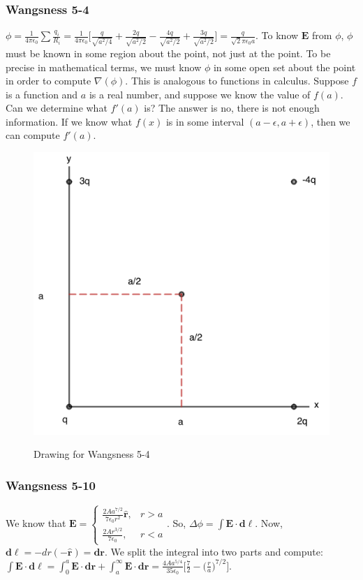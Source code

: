 \documentclass[oneside]{book}
\theoremstyle{mystyle}
\begin{document}
\subsubsection{Wangsness 5-4}
$\phi = \frac{1}{4\pi \epsilon_0} \sum \frac{q_i}{R_i} = \frac{1}{4\pi \epsilon_0}\bigg[ \frac{q}{\sqrt{a^2/4}}+\frac{2q}{\sqrt{a^2/2}}-\frac{4q}{\sqrt{a^2/2}}+\frac{3q}{\sqrt{a^2/2}}\bigg] = \frac{q}{\sqrt{2}\pi \epsilon_0 a}$. To know $\mathbf{E}$ from $\phi$, $\phi$ must be known in some region about the point, not just at the point. To be precise in mathematical terms, we must know $\phi$ in some open set about the point in order to compute $\nabla(\phi)$. This is analogous to functions in calculus. Suppose $f$ is a function and $a$ is a real number, and suppose we know the value of $f(a)$. Can we determine what $f'(a)$ is? The answer is no, there is not enough information. If we know what $f(x)$ is in some interval $(a-\epsilon,a+\epsilon)$, then we can compute $f'(a)$.
\begin{figure}[htbp]
    \centering
    {\includegraphics[scale=0.4]{5-4.png}}
    \caption{Drawing for Wangsness 5-4}
\end{figure}
\subsubsection{Wangsness 5-10}
We know that $\mathbf{E} = \begin{cases} \frac{2A a^{7/2}}{7\epsilon_0 r^2}\hat{\mathbf{r}}, & r>a \\ \frac{2A r^{3/2}}{7\epsilon_0}, & r<a\end{cases}$. So, $\Delta \phi = \int \mathbf{E} \cdot \mathbf{d\ell}$. Now, $\mathbf{d\ell} = -dr(-\hat{\mathbf{r}}) = \mathbf{dr}$. We split the integral into two parts and compute: $\int \mathbf{E}\cdot \mathbf{d\ell} = \int_{0}^{a} \mathbf{E}\cdot \mathbf{dr} + \int_{a}^{\infty} \mathbf{E}\cdot \mathbf{dr} = \frac{4A a^{5/4}}{35 \epsilon_0}\bigg[ \frac{7}{2}-\big(\frac{r}{a}\big)^{7/2}\bigg]$.
\end{document}

